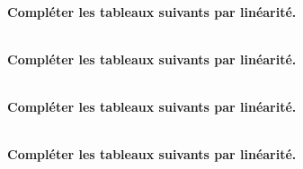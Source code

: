 \exercice \diff[4] \\
\textbf{Compléter les tableaux suivants par linéarité.}
\mc{


\columnbreak


}

\exercice \diff[4] \\
\textbf{Compléter les tableaux suivants par linéarité.}
\mc{


\columnbreak


}

\exercice \diff[4] \\
\textbf{Compléter les tableaux suivants par linéarité.}
\mc{


\columnbreak


}

\exercice \diff[4] \\
\textbf{Compléter les tableaux suivants par linéarité.}
\mc{


\columnbreak


}


